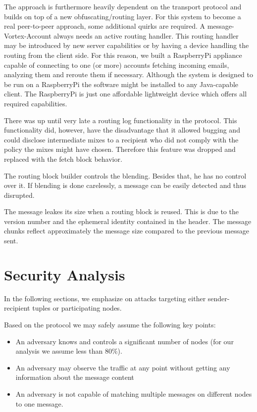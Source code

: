The approach is furthermore heavily dependent on the transport protocol and builds on top of a new obfuscating/routing layer. For this system to become a real peer-to-peer approach, some additional quirks are required. A message-Vortex-Account always needs an active routing handler. This routing handler may be introduced by new server capabilities or by having a device handling the routing from the client side. For this reason, we built a RaspberryPi appliance capable of connecting to one (or more) accounts fetching incoming emails, analyzing them and reroute them if necessary. Although the system is designed to be run on a RaspberryPi the software might be installed to any Java-capable client. The RaspberryPi is just one affordable lightweight device which offers all required capabilities.

There was up until very late a routing log functionality in the protocol. This functionality did, however, have the disadvantage that it allowed bugging and could disclose intermediate mixes to a recipient who did not comply with the policy the mixes might have chosen. Therefore this feature was dropped and replaced with the fetch block behavior.

The routing block builder controls the blending. Besides that, he has no control over it. If blending is done carelessly, a message can be easily detected and thus disrupted.

The message leakes its size when a routing block is reused.  This is due to the version number and the ephemeral identity contained in the header. The message chunks reflect approximately the message size compared to the previous message sent.

\chapter{Security Analysis}
In the following sections, we emphasize on attacks targeting either sender-recipient tuples or participating nodes. 

Based on the protocol we may safely assume the following key points:
\begin{itemize}
	\item An adversary knows and controls a significant number of nodes (for our analysis we assume less than 80\%).
	\item An adversary may observe the traffic at any point without getting any information about the message content
	\item An adversary is not capable of matching multiple messages on different nodes to one message.
\end{itemize}

